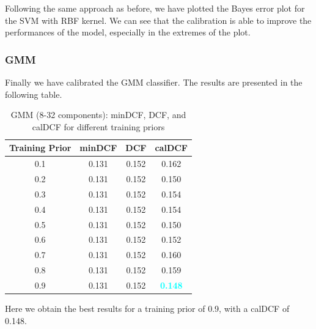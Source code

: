 \documentclass[12pt]{report}
\begin{document}
\noindent
Following the same approach as before, we have plotted the Bayes error plot for the SVM with RBF kernel. We can see that the calibration is able to improve the performances of the model, especially in the extremes of the plot.
\subsubsection*{GMM}
Finally we have calibrated the GMM classifier. The results are presented in the following table.
\begin{table}[H]
    \centering
    \begin{tabular}{|c|c|c|c|}
        \hline
        \rowcolor{blue!10}
        \textbf{Training Prior} & \textbf{minDCF} & \textbf{DCF} & \textbf{calDCF}                  \\
        \hline
        0.1                     & 0.131           & 0.152        & 0.162                            \\
        \hline
        0.2                     & 0.131           & 0.152        & 0.150                            \\
        \hline
        0.3                     & 0.131           & 0.152        & 0.154                            \\
        \hline
        0.4                     & 0.131           & 0.152        & 0.154                            \\
        \hline
        0.5                     & 0.131           & 0.152        & 0.150                            \\
        \hline
        0.6                     & 0.131           & 0.152        & 0.152                            \\
        \hline
        0.7                     & 0.131           & 0.152        & 0.160                            \\
        \hline
        0.8                     & 0.131           & 0.152        & 0.159                            \\
        \hline
        0.9                     & 0.131           & 0.152        & \textcolor{cyan}{\textbf{0.148}} \\
        \hline
    \end{tabular}
    \caption{GMM (8-32 components): minDCF, DCF, and calDCF for different training priors}
    \label{tab:GMM_Priors}
\end{table}
\noindent
Here we obtain the best results for a training prior of 0.9, with a calDCF of 0.148.
\end{document}
